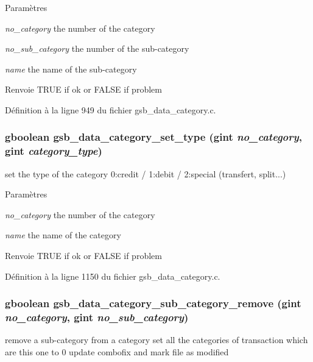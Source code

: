\begin{DoxyParams}{Paramètres}
\item[{\em no\_\-category}]the number of the category \item[{\em no\_\-sub\_\-category}]the number of the sub-\/category \item[{\em name}]the name of the sub-\/category\end{DoxyParams}
\begin{DoxyReturn}{Renvoie}
TRUE if ok or FALSE if problem 
\end{DoxyReturn}


Définition à la ligne 949 du fichier gsb\_\-data\_\-category.c.

\subsubsection[{gsb\_\-data\_\-category\_\-set\_\-type}]{\setlength{\rightskip}{0pt plus 5cm}gboolean gsb\_\-data\_\-category\_\-set\_\-type (gint {\em no\_\-category}, \/  gint {\em category\_\-type})}\label{gsb__data__category_8c_a5378b0ca829c745cd3cd2b8c11d090fd}
set the type of the category 0:credit / 1:debit / 2:special (transfert, split...)


\begin{DoxyParams}{Paramètres}
\item[{\em no\_\-category}]the number of the category \item[{\em name}]the name of the category\end{DoxyParams}
\begin{DoxyReturn}{Renvoie}
TRUE if ok or FALSE if problem 
\end{DoxyReturn}


Définition à la ligne 1150 du fichier gsb\_\-data\_\-category.c.

\subsubsection[{gsb\_\-data\_\-category\_\-sub\_\-category\_\-remove}]{\setlength{\rightskip}{0pt plus 5cm}gboolean gsb\_\-data\_\-category\_\-sub\_\-category\_\-remove (gint {\em no\_\-category}, \/  gint {\em no\_\-sub\_\-category})}\label{gsb__data__category_8c_a46cf96dd8292ede898029509cd912c13}
remove a sub-\/category from a category set all the categories of transaction which are this one to 0 update combofix and mark file as modified


